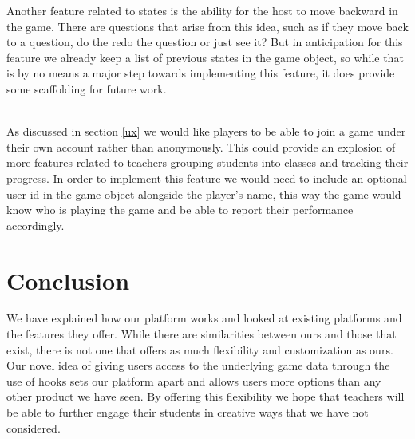 \documentclass{article}
\begin{document}
    Another feature related to states is the ability for the host to move backward in the game. There are questions that arise from this idea, such as if they move back to a question, do the redo the question or just see it? But in anticipation for this feature we already keep a list of previous states in the game object, so while that is by no means a major step towards implementing this feature, it does provide some scaffolding for future work.
    \\\\
    \smallskip
    
    As discussed in section \ref{ux} we would like players to be able to join a game under their own account rather than anonymously. This could provide an explosion of more features related to teachers grouping students into classes and tracking their progress. In order to implement this feature we would need to include an optional user id in the game object alongside the player's name, this way the game would know who is playing the game and be able to report their performance accordingly.
    
\section{Conclusion}
    We have explained how our platform works and looked at existing platforms and the features they offer. While there are similarities between ours and those that exist, there is not one that offers as much flexibility and customization as ours. Our novel idea of giving users access to the underlying game data through the use of hooks sets our platform apart and allows users more options than any other product we have seen. By offering this flexibility we hope that teachers will be able to further engage their students in creative ways that we have not considered. 

\printbibliography[title={Bibliography}]
\end{document}
